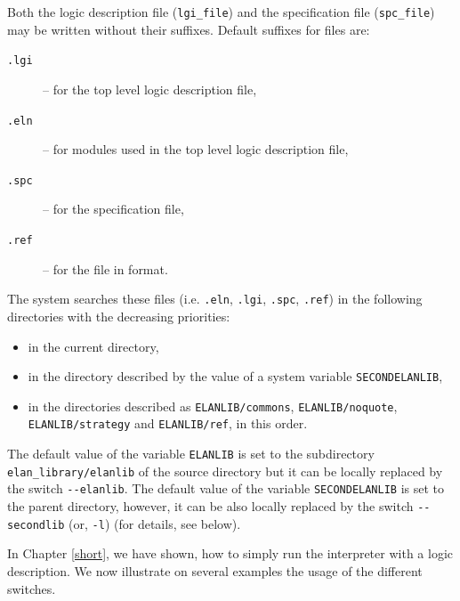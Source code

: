 \noindent
Both the logic description file (\verb|lgi_file|) and  
the specification file (\verb|spc_file|)
may be written without their suffixes. 
Default suffixes for \elan{} files are:
\begin{description}
\item[\tt .lgi] -- for the top level logic description file,
\item[\tt .eln] -- for modules used in the top level logic description file,
\item[\tt .spc] -- for the specification file,
\item[\tt .ref] -- for the file in \REF{} format.
\end{description}
%
The system \elan{} searches these files 
(i.e. \verb|.eln|, \verb|.lgi|, \verb|.spc|, \verb|.ref|)
in the following directories with the decreasing priorities:
\begin{itemize}
  \item in the current directory,
  \item in the directory described by the value of a 
    system variable {\tt SECONDELANLIB},
  \item in the directories described as {\tt ELANLIB/commons},
    {\tt ELANLIB/noquote}, {\tt ELANLIB/strategy} and {\tt ELANLIB/ref},
    in this order.
\end{itemize}
%
The default value of the variable {\tt ELANLIB} is set to the subdirectory {\tt elan\_library/elanlib} of the source directory but it can be locally replaced by the switch \verb|--elanlib|. 
The default value of the variable {\tt SECONDELANLIB} is set to the
parent directory, however, it can be also locally replaced by the
switch \verb|--secondlib| (or, \verb|-l|) (for details, see below).

In Chapter \ref{short}, we have shown, how to simply run the 
\elan{} interpreter with a logic description. We now illustrate
on several examples the usage of the different switches.

